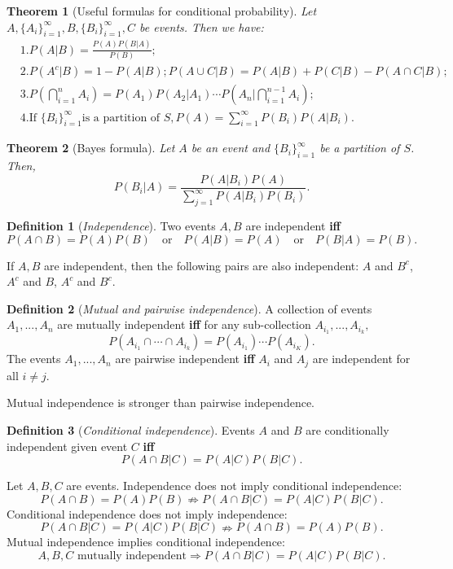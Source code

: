 \documentclass[11pt]{article}
\theoremstyle{plain}
\newtheorem{thm}{Theorem}[section]
\theoremstyle{definition}
\newtheorem{defn}{Definition}
\begin{document}
\begin{thm}[Useful formulas for conditional probability]\label{thm:condprobability}
Let $A,\{A_i\}_{i=1}^{\infty}, B, \{B_i\}_{i=1}^{\infty},C$ be events. Then we have:
\begin{align}
	&1.  P(A|B) = \frac{P(A)P(B|A)}{P(B)}; \\
	&2. P(A^c|B) = 1- P(A|B); P(A \cup C|B) = P(A|B) + P(C|B) - P(A \cap C|B);\\
	&3. P(\bigcap_{i=1}^{n} A_i) = P(A_1) P(A_2|A_1)\cdots P(A_n|\bigcap_{i=1}^{n-1} A_i);\\
	&4. \text{If } \{B_i\}_{i=1}^{\infty} \text{is a partition of }S, P(A) = \sum_{i=1}^{\infty} P(B_i) P(A|B_i).
\end{align}
\end{thm}

\begin{thm}[Bayes formula]\label{thm:bayesformula}
Let $A$ be an event and $\{ B_i\}_{i=1}^{\infty}$ be a partition of $S$. Then,
\[  P(B_i|A) = \frac{P(A|B_i) P(A)}{\sum_{j=1}^{\infty} P(A|B_i) P(B_i) }.  \]
\end{thm}

\begin{defn}[\textit{Independence}]\label{def:indep}
Two events $A,B$ are independent \textbf{iff} 
\[ P(A\cap B) = P(A) P(B) \quad \text{or} \quad P(A|B) = P(A) \quad \text{or} \quad  P(B|A) = P(B).\]
\end{defn}
If $A,B$ are independent, then the following pairs are also independent: $A$ and $B^c$,  $A^c$ and $B$, $A^c$ and $B^c$.

\begin{defn}[\textit{Mutual  and pairwise independence}]\label{def:mindep} A collection of events $A_1,...,A_n$ are mutually independent \textbf{iff} for any sub-collection $A_{i_1},...,A_{i_k},$
\[ P(A_{i_1} \cap \cdots \cap A_{i_k}) = P(A_{i_1})\cdots P(A_{i_K}). \]
The events $A_1,...,A_n$ are pairwise independent \textbf{iff} $A_i$ and $A_j$ are independent for all $i\neq j$.

Mutual independence is stronger than pairwise independence.
\end{defn}

\begin{defn}[\textit{Conditional independence}]\label{def:cindep}
Events $A$ and $B$ are conditionally independent given event $C$ \textbf{iff} 
\[ P(A\cap B|C) = P(A|C)P(B|C).\]
\end{defn}

Let $A,B,C$ are events. Independence does not imply conditional independence:
\[ P(A\cap B) = P(A) P(B) \nRightarrow P(A\cap B|C) = P(A|C) P(B|C). \]
Conditional independence does not imply independence:
\[ P(A\cap B|C) = P(A|C) P(B|C) \nRightarrow P(A\cap B) = P(A) P(B).  \]
Mutual independence implies conditional independence:
\[ A,B,C\text{ mutually independent} \Rightarrow P(A\cap B|C) = P(A|C) P(B|C). \]
\end{document}
